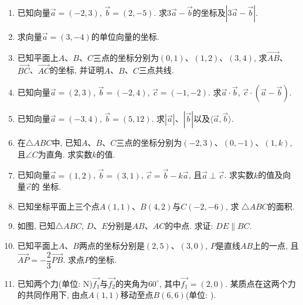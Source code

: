 \documentclass[10pt,a4paper]{article}
\begin{document}
\begin{enumerate}[1.]
\item 已知向量$\overrightarrow a=(-2, 3)$, $\overrightarrow b=(2, -5)$. 求$3\overrightarrow a-\overrightarrow b$的坐标及$|3\overrightarrow a-\overrightarrow b|$.
\item 求向量$\overrightarrow a=(3, -4)$的单位向量的坐标.
\item 已知平面上$A$、$B$、$C$三点的坐标分别为$(0, 1)$、$(1, 2)$、$(3, 4)$, 求$\overrightarrow{AB}$、$\overrightarrow{BC}$、$\overrightarrow{AC}$的坐标, 并证明$A$、$B$、$C$三点共线.
\item 已知向量$\overrightarrow a=(2, 3)$, $\overrightarrow b=(-2, 4)$, $\overrightarrow c=(-1, -2)$. 求$\overrightarrow a\cdot \overrightarrow b$, $\overrightarrow c\cdot (\overrightarrow a-\overrightarrow b)$.
\item 已知向量$\overrightarrow a=(-3, 4)$, $\overrightarrow b=(5, 12)$. 求$|\overrightarrow a|$、$|\overrightarrow b|$以及$\langle \overrightarrow a, \overrightarrow b\rangle$.
\item 在$\triangle ABC$中, 已知$A$、$B$、$C$三点的坐标分别为$(-2, 3)$、$(0, -1)$、$(1, k)$, 且$\angle C$为直角. 求实数$k$的值.
\item 已知向量$\overrightarrow a=(1, 2)$, $\overrightarrow b=(3, 1)$, $\overrightarrow c=\overrightarrow b-k\overrightarrow a$, 且$\overrightarrow a\perp \overrightarrow c$. 求实数$k$的值及向量$\overrightarrow c$的
坐标.  
\item 已知坐标平面上三个点$A(1, 1)$、$B(4, 2)$与$C(-2, -6)$, 求
$\triangle ABC$的面积.
\item 如图, 已知$\triangle ABC$, $D$、$E$分别是$AB$、$AC$的中点. 求证: $DE\parallel BC$.
\begin{center}
\end{center}
\item 已知平面上$A$、$B$两点的坐标分别是$(2, 5)$、$(3, 0)$, $P$是直线$AB$上的一点, 且$\overrightarrow{AP}=-\dfrac 23\overrightarrow{PB}$. 求点$P$的坐标.
\item 已知两个力(单位: $\text{N}$)$\overrightarrow{f_1}$与$\overrightarrow{f_2}$的夹角为$60^\circ$, 其中$\overrightarrow{f_1}=(2, 0)$. 某质点在这两个力的共同作用下, 由点$A(1, 1)$移动至点$B(6, 6)$(单位: ).\\

\end{enumerate}
\end{document}
